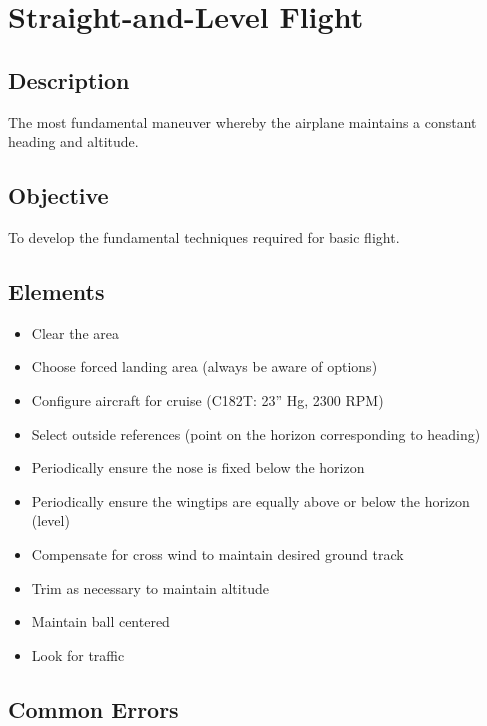 \section{Straight-and-Level Flight}

\subsection{Description}

The most fundamental maneuver whereby the airplane maintains a constant heading
and altitude.

\subsection{Objective}

To develop the fundamental techniques required for basic flight.

\subsection{Elements}

\begin{itemize}
  \item Clear the area
  \item Choose forced landing area (always be aware of options) 
  \item Configure aircraft for cruise (C182T: 23'' Hg, 2300 RPM)
  \item Select outside references (point on the horizon corresponding to
    heading)
  \item Periodically ensure the nose is fixed below the horizon
  \item Periodically ensure the wingtips are equally above or below the horizon
    (level)
  \item Compensate for cross wind to maintain desired ground track
  \item Trim as necessary to maintain altitude
  \item Maintain ball centered
  \item Look for traffic
\end{itemize}

\subsection{Common Errors}

